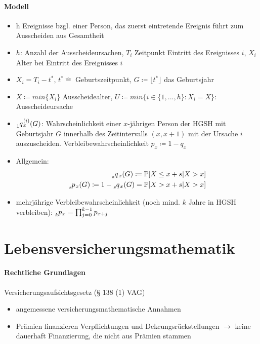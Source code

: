 \documentclass[12pt]{report}
\theoremstyle{dotless}
\theoremstyle{definition}
\begin{document}
\subsubsection{Modell}
\begin{itemize}
	\item h Ereignisse bzgl. einer Person, das zuerst eintretende Ereignis führt zum Ausscheiden aus Gesamtheit
	\item $h$: Anzahl der Ausscheideursachen, $T_i$ Zeitpunkt Eintritt des Ereignisses $i$, $X_i$ Alter bei Eintritt des Ereignisses $i$
	\item $X_i = T_i-t^*$, $t^* \hat{=}$ Geburtszeitpunkt, $G \coloneqq \lfloor t^* \rfloor$ das Geburtsjahr
	\item $X\coloneqq min\{X_i\}$ Ausscheidealter, $U\coloneqq min\{i \in \{1,...,h\}:X_i=X\}$: Ausscheideursache
	\item $\tensor[_{1}]{q}{}_x^{(i)}(G)$: Wahrscheinlichkeit einer $x$-jährigen Person der HGSH mit Geburtsjahr $G$ innerhalb des Zeitintervalls $(x,x+1)$ mit der Ursache $i$ auszuscheiden. Verbleibewahrscheinlichkeit $p_x \coloneqq 1-q_x$
	\item Allgemein: 
	\begin{align}
		\tensor[_{s}]{q}{}_x(G)\coloneqq \mathbb{P}[X \leq x+s | X>x] \\
		\tensor[_{s}]{p}{}_x(G) \coloneqq 1-\tensor[_{s}]{q}{}_x(G) = \mathbb{P}[X>x+s|X>x]
	\end{align}
	\item mehrjährige Verbleibewahrscheinlichkeit (noch mind. $k$ Jahre in HGSH verbleiben): $\tensor[_{k}]{p}{}_x = \prod_{j=0}^{k-1}p_{x+j}$
\end{itemize}













\chapter{Lebensversicherungsmathematik}

\subsubsection{Rechtliche Grundlagen}
Versicherungsaufsichtsgesetz (§ 138 (1) VAG)
\begin{itemize}
\item angemessene versicherungsmathematische Annahmen
\item Prämien finanzieren Verpflichtungen und Dekcungsrückstellungen $\rightarrow$ keine dauerhaft Finanzierung, die nicht aus Prämien stammen
\end{itemize}
\end{document}
